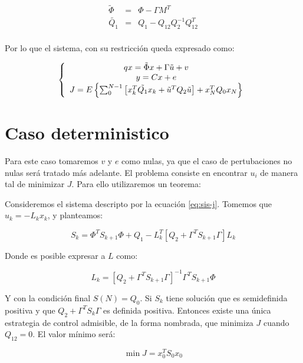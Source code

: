 \begin{equation}
    \begin{array}{ccc}
        \tilde{\Phi} & = & \Phi - \Gamma M^T \\ 
        \tilde{Q_1} & = & Q_1 - Q_{12}Q_2^{-1}Q_{12}^T \\ 
    \end{array}
\end{equation}

Por lo que el sistema, con su restricción queda expresado como: 

\begin{equation}
    \label{eq:sis-j}
    \left\{ \begin{array}{c} 
        qx = \tilde{\Phi}x + \Gamma \tilde{u} + v \\ 
        y = C x + e\\ 
        J = E\left\{ 
            \sum_0^{N-1}\left[ 
                x^T_k\tilde{Q_1}x_k + \tilde{u}^TQ_2\tilde{u}
            \right] + x^T_NQ_0x_N
        \right\}
     \end{array} \right.
\end{equation}

\section{Caso deterministico}

Para este caso tomaremos $v$ y $e$ como nulas, ya que el caso de pertubaciones no nulas será tratado más adelante.
El problema consiste en encontrar $u_i$ de manera tal de minimizar $J$. Para ello utilizaremos un teorema: 

Consideremos el sistema descripto por la ecuación \ref{eq:sis-j}. Tomemos que $u_k=-L_kx_k$, y planteamos: 

\begin{equation}
    S_k = 
    \Phi^T S_{k+1} \Phi + Q_1 -
    L^T_k[ Q_2 + \Gamma^TS_{k+1}\Gamma ]L_k
\end{equation}

Donde es posible expresar a $L$ como: 

\begin{equation}
    L_k = 
    [Q_2 + \Gamma^TS_{k+1}\Gamma]^{-1}\Gamma^TS_{k+1}\Phi
\end{equation}

Y con la condición final $S(N)=Q_0$. Si $S_k$ tiene solución
que es semidefinida positiva y que $Q_2+\Gamma^TS_k\Gamma$ es definida positiva. 
Entonces existe una única estrategia de control admisible, de la forma nombrada, que 
minimiza $J$ cuando $Q_{12}=0$. El valor mínimo será:

\begin{equation}
    \min{J}=x_0^TS_0x_0
\end{equation}

